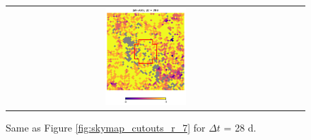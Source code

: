\documentclass[preprintm,linenumbers]{aastex631}
\begin{document}
\begin{figure}
\begin{tabular}{  c c c}
				\includegraphics[width=0.3\textwidth]{results/skymaps_cutout/skymaps_cutout_delta_first_year_one_snap_v4_0_10yrs_db_noDD_noTwi_tscale-28_nside-256_doAllTemplateMetrics_reduceCount_r_GP_noDD_noTwi.pdf} \\
			\end{tabular}
			\caption{
				 Same as Figure \ref{fig:skymap_cutouts_r_7} for $\Delta t$ = 28 d.  
			}
   \label{fig:skymap_cutouts_r_28}
		\end{figure}


  
		

  		

    
	
\end{document}
